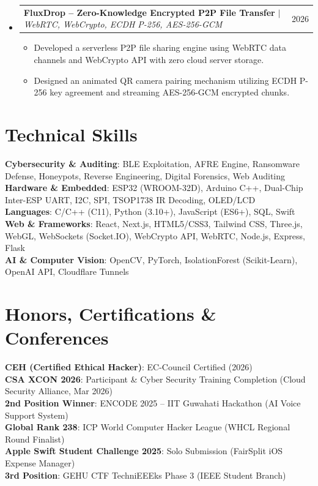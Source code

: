 \documentclass[letterpaper,11pt]{article}
\makeatletter
\newcommand{\resumeItem}[1]{
  \item\small{
    {#1 \vspace{-2pt}}
  }
}
\newcommand{\resumeProjectHeading}[2]{
    \item
    \begin{tabular*}{\textwidth}{l@{\extracolsep{\fill}}r}
      \small#1 & #2 \\
    \end{tabular*}\vspace{-7pt}
}
\newenvironment{itemList}{\begin{itemize}[leftmargin=0.15in, label={}]}{\end{itemize}}
\makeatother
\begin{document}
\begin{itemList}
      \resumeProjectHeading
          {\textbf{FluxDrop -- Zero-Knowledge Encrypted P2P File Transfer} $|$ \emph{WebRTC, WebCrypto, ECDH P-256, AES-256-GCM}}{2026}
          \begin{itemize}
            \resumeItem{Developed a serverless P2P file sharing engine using WebRTC data channels and WebCrypto API with zero cloud server storage.}
            \resumeItem{Designed an animated QR camera pairing mechanism utilizing ECDH P-256 key agreement and streaming AES-256-GCM encrypted chunks.}
          \end{itemize}

    \end{itemList}


\section{Technical Skills}
 \begin{itemList}
    \small{\item{
     \textbf{Cybersecurity \& Auditing}{: BLE Exploitation, AFRE Engine, Ransomware Defense, Honeypots, Reverse Engineering, Digital Forensics, Web Auditing} \\
     \textbf{Hardware \& Embedded}{: ESP32 (WROOM-32D), Arduino C++, Dual-Chip Inter-ESP UART, I2C, SPI, TSOP1738 IR Decoding, OLED/LCD} \\
     \textbf{Languages}{: C/C++ (C11), Python (3.10+), JavaScript (ES6+), SQL, Swift} \\
     \textbf{Web \& Frameworks}{: React, Next.js, HTML5/CSS3, Tailwind CSS, Three.js, WebGL, WebSockets (Socket.IO), WebCrypto API, WebRTC, Node.js, Express, Flask} \\
     \textbf{AI \& Computer Vision}{: OpenCV, PyTorch, IsolationForest (Scikit-Learn), OpenAI API, Cloudflare Tunnels}
    }}
 \end{itemList}


\section{Honors, Certifications \& Conferences}
 \begin{itemList}
    \small{\item{
     \textbf{CEH (Certified Ethical Hacker)}{: EC-Council Certified (2026)} \\
     \textbf{CSA XCON 2026}{: Participant \& Cyber Security Training Completion (Cloud Security Alliance, Mar 2026)} \\
     \textbf{2nd Position Winner}{: ENCODE 2025 -- IIT Guwahati Hackathon (AI Voice Support System)} \\
     \textbf{Global Rank 238}{: ICP World Computer Hacker League (WHCL Regional Round Finalist)} \\
     \textbf{Apple Swift Student Challenge 2025}{: Solo Submission (FairSplit iOS Expense Manager)} \\
     \textbf{3rd Position}{: GEHU CTF TechniEEEks Phase 3 (IEEE Student Branch)}
    }}
 \end{itemList}

\end{document}
